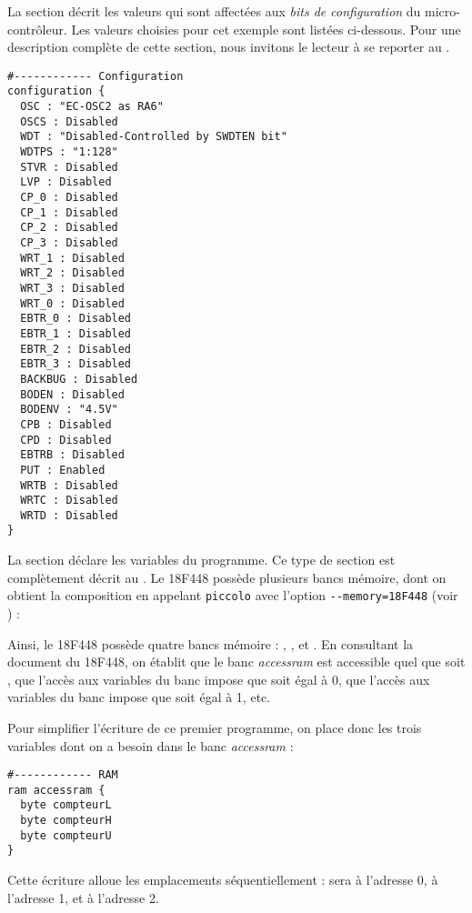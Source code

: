 La section  décrit les valeurs qui sont affectées aux \emph{bits de configuration} du micro-contrôleur. Les valeurs choisies pour cet exemple sont listées ci-dessous. Pour une description complète de cette section, nous invitons le lecteur à se reporter au .
\begin{lstlisting}[language=piccolo]
#------------ Configuration
configuration {
  OSC : "EC-OSC2 as RA6"
  OSCS : Disabled
  WDT : "Disabled-Controlled by SWDTEN bit"
  WDTPS : "1:128"
  STVR : Disabled
  LVP : Disabled
  CP_0 : Disabled
  CP_1 : Disabled
  CP_2 : Disabled
  CP_3 : Disabled
  WRT_1 : Disabled
  WRT_2 : Disabled
  WRT_3 : Disabled
  WRT_0 : Disabled
  EBTR_0 : Disabled
  EBTR_1 : Disabled
  EBTR_2 : Disabled
  EBTR_3 : Disabled
  BACKBUG : Disabled
  BODEN : Disabled
  BODENV : "4.5V"
  CPB : Disabled
  CPD : Disabled
  EBTRB : Disabled
  PUT : Enabled
  WRTB : Disabled
  WRTC : Disabled
  WRTD : Disabled
}
\end{lstlisting}


La section  déclare les variables du programme. Ce type de section est complètement décrit au . Le 18F448 possède plusieurs bancs mémoire, dont on obtient la composition en appelant \texttt{piccolo} avec l'option \texttt{-{}-memory=18F448} (voir ) :


{\footnotesize }

Ainsi, le 18F448 possède quatre bancs mémoire : , ,  et . En consultant la document du 18F448, on établit que le banc \emph{accessram} est accessible quel que soit , que l'accès aux variables du banc  impose que  soit égal à 0, que l'accès aux variables du banc  impose que  soit égal à 1, etc.

Pour simplifier l'écriture de ce premier programme, on place donc les trois variables dont on a besoin dans le banc \emph{accessram} :
\begin{lstlisting}[language=piccolo]
#------------ RAM
ram accessram {
  byte compteurL
  byte compteurH
  byte compteurU
}
\end{lstlisting}

Cette écriture alloue les emplacements séquentiellement :  sera à l'adresse 0,  à l'adresse 1, et  à l'adresse 2.


